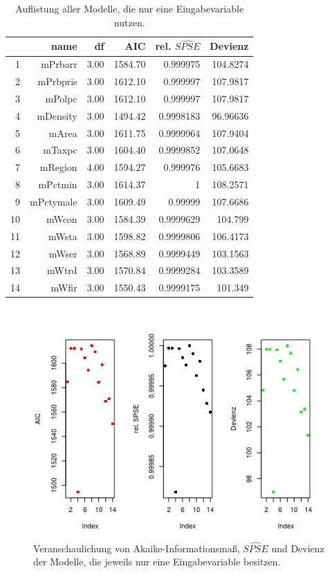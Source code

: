\begin{table}[ht]
\centering
\begin{tabular}{rrrrrr}
  \hline
  & name & df & AIC & rel. $\hat{SPSE}$ & Devienz \\ 
  \hline
  1 & mPrbarr & 3.00 & 1584.70 & 0.999975 &  104.8274\\ 
  2 & mPrbpris & 3.00 & 1612.10 & 0.999997 & 107.9817 \\ 
  3 & mPolpc & 3.00 & 1612.10 & 0.999997 &  107.9817\\ 
  4 & mDensity & 3.00 & 1494.42 & 0.9998183 &  96.96636\\ 
  5 & mArea & 3.00 & 1611.75 & 0.9999964 &  107.9404\\ 
  6 & mTaxpc & 3.00 & 1604.40 & 0.9999852 & 107.0648 \\ 
  7 & mRegion & 4.00 & 1594.27 &  0.999976 & 105.6683\\ 
  8 & mPctmin & 3.00 & 1614.37 &  1 & 108.2571\\ 
  9 & mPctymale & 3.00 & 1609.49 & 0.99999 &  107.6686\\ 
  10 & mWcon & 3.00 & 1584.39 &  0.9999629 & 104.799\\ 
  11 & mWsta & 3.00 & 1598.82 &  0.9999806 & 106.4173\\ 
  12 & mWser & 3.00 & 1568.89 &  0.9999449 & 103.1563\\ 
  13 & mWtrd & 3.00 & 1570.84 &  0.9999284 & 103.3589\\ 
  14 & mWfir & 3.00 & 1550.43 &  0.9999175 & 101.349\\ 
   \hline
\end{tabular}
\caption[alle einfachen Modelle]{Auflistung aller Modelle, die nur eine Eingabevariable nutzen.}
\label{tab:asv}
\end{table}
 
\begin{figure}
\centering
\includegraphics[scale=.7]{./jpgs/asvc.jpeg}
\caption[\"Ubersicht einfacher Modelle]{Veranschaulichung von Akaike-Informationsma\ss{}, $\hat{SPSE}$ und Devienz der Modelle, die jeweils nur eine Eingabevariable besitzen.}
\label{fig:asv}
\end{figure} 
 
